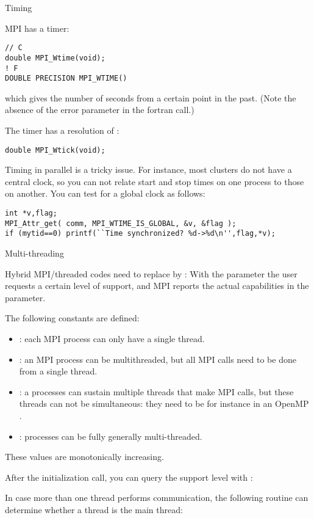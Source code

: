  {Timing}

MPI has a  timer: 
\begin{verbatim}
// C
double MPI_Wtime(void);
! F
DOUBLE PRECISION MPI_WTIME()
\end{verbatim}
which gives the number of seconds from a certain point in the past.
(Note the absence of the error parameter in the fortran call.)

The timer has a resolution of :
\begin{verbatim}
double MPI_Wtick(void);
\end{verbatim}

Timing in parallel is a tricky issue. For instance, most clusters do
not have a central clock, so you can not relate start and stop times
on one process to those on another. You can test for a global clock as
follows:
\begin{verbatim}
int *v,flag;
MPI_Attr_get( comm, MPI_WTIME_IS_GLOBAL, &v, &flag );
if (mytid==0) printf(``Time synchronized? %d->%d\n'',flag,*v);
\end{verbatim}


 {Multi-threading}

Hybrid MPI/threaded codes need to replace 
by :
%
%
With the  parameter the user requests a certain level of support,
and MPI reports the actual capabilities in the  parameter.

The following constants are defined:
\begin{itemize}
\item {}: each MPI process can only have
  a single thread.
\item {}: an MPI process can be
  multithreaded, but all MPI calls need to be done from a single
  thread.
\item {}: a processes can sustain
  multiple threads that make MPI calls, but these threads can not be
  simultaneous: they need to be for instance in an OpenMP
  .
\item {}: processes can be fully
  generally multi-threaded.
\end{itemize}
These values are monotonically increasing.

After the initialization call, you can query the support level
with :
%

In case more than one thread performs communication, the following routine
can determine whether a thread is the main thread:
%
